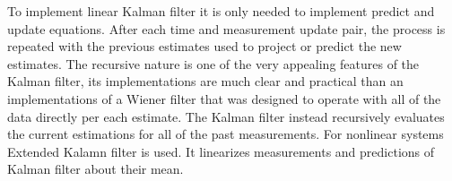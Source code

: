 \documentclass[../../main]{subfiles}
\begin{document}
To implement linear Kalman filter it is only needed to implement predict and update equations. After each time and measurement update pair, the process is repeated with the previous estimates used to project or predict the new estimates. The recursive nature is one of the very appealing features of the Kalman filter, its implementations are much clear and practical than an implementations of a Wiener filter that was designed to operate with all of the data directly per each estimate. The Kalman filter instead recursively evaluates the current estimations for all of the past measurements.
For nonlinear systems Extended Kalamn filter is used. It linearizes measurements and predictions of Kalman filter about their mean.
\end{document}
